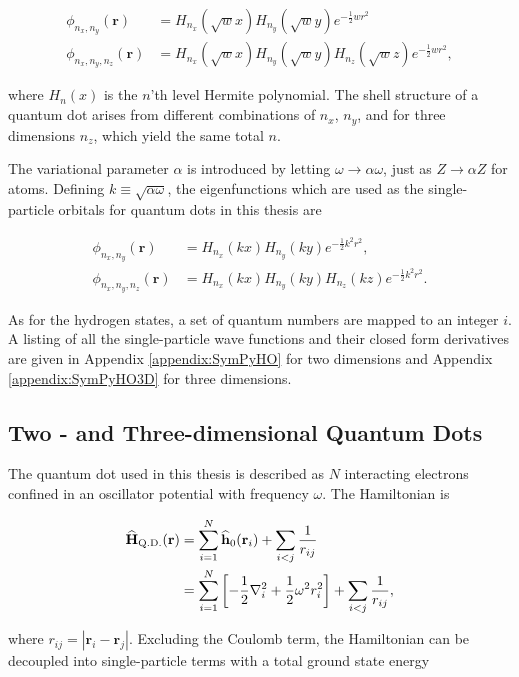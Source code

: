 \begin{align}
\phi_{n_x, n_y}(\mathbf{r}) &= H_{n_x}(\sqrt{w}x)H_{n_y}(\sqrt{w}y)e^{-\frac{1}{2}wr^2} \\
\phi_{n_x, n_y, n_z}(\mathbf{r}) &= H_{n_x}(\sqrt{w}x)H_{n_y}(\sqrt{w}y)H_{n_z}(\sqrt{w}z)e^{-\frac{1}{2}wr^2},
\end{align}

where $H_n(x)$ is the $n$'th level Hermite polynomial. The shell structure of a quantum dot arises from different combinations of $n_x$, $n_y$, and for three dimensions $n_z$, which yield the same total $n$.

The variational parameter $\alpha$ is introduced by letting $\omega\to\alpha\omega$, just as $Z\to\alpha Z$ for atoms. Defining $k\equiv\sqrt{\alpha\omega}$, the eigenfunctions which are used as the single-particle orbitals for quantum dots in this thesis are

\begin{align}
\phi_{n_x, n_y}(\mathbf{r}) &= H_{n_x}(kx)H_{n_y}(ky)e^{-\frac{1}{2}k^2r^2}, \\
\phi_{n_x, n_y, n_z}(\mathbf{r}) &= H_{n_x}(kx)H_{n_y}(ky)H_{n_z}(kz)e^{-\frac{1}{2}k^2r^2}.
\end{align}

As for the hydrogen states, a set of quantum numbers are mapped to an integer $i$.  A listing of all the single-particle wave functions and their closed form derivatives are given in Appendix \ref{appendix:SymPyHO} for two dimensions and Appendix \ref{appendix:SymPyHO3D} for three dimensions. 


\subsection{Two - and Three-dimensional Quantum Dots}

The quantum dot used in this thesis is described as $N$ interacting electrons confined in an oscillator potential with frequency $\omega$. The Hamiltonian is

\begin{align}
 {\bf\widehat{H}}_{\mathrm{Q.D.}}(\mathbf{r}) &= \sum_{i=1}^N {\bf\widehat{h}}_0(\mathbf{r}_i) + \sum_{i<j} \frac{1}{r_{ij}} \\
                         &= \sum_{i=1}^N \left[-\frac{1}{2}\nabla_i^2 + \frac{1}{2}\omega^2r_i^2 \right] + \sum_{i<j} \frac{1}{r_{ij}},
\end{align}

where $r_{ij} = |\mathbf{r}_i -\mathbf{r}_j|$. Excluding the Coulomb term, the Hamiltonian can be decoupled into single-particle terms with a total ground state energy \cite{griffiths}

